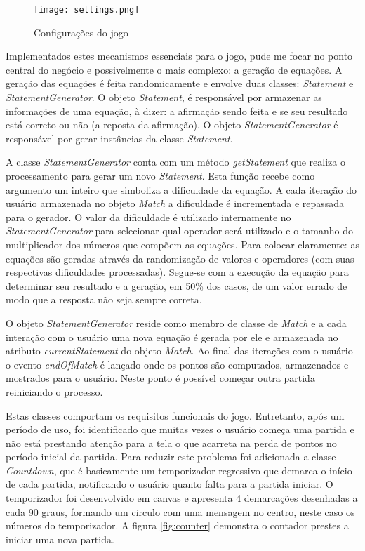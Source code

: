 \begin{figure}[H]
    \centering
    \texttt{[image: settings.png]}
	\caption{Configurações do jogo}
    \label{fig:configurations}
\end{figure}

Implementados estes mecanismos essenciais para o jogo, pude me focar no
ponto central do negócio e possivelmente o mais complexo: a geração
de equações. A geração das equações é feita randomicamente e
envolve duas classes: \textit{Statement} e \textit{StatementGenerator}.
O objeto \textit{Statement}, é responsável por armazenar as
informações de uma equação, à dizer: a afirmação sendo feita
e se seu resultado está correto ou não (a reposta da afirmação).
O objeto \textit{StatementGenerator} é responsável por gerar
instâncias da classe \textit{Statement}.

A classe \textit{StatementGenerator} conta com um método
\textit{getStatement} que realiza o processamento para gerar um novo
\textit{Statement}. Esta função recebe como argumento um inteiro que
simboliza a dificuldade da equação. A cada iteração do usuário
armazenada no objeto \textit{Match} a dificuldade é incrementada
e repassada para o gerador. O valor da dificuldade é utilizado
internamente no \textit{StatementGenerator} para selecionar qual
operador será utilizado e o tamanho do multiplicador dos números
que compõem as equações. Para colocar claramente: as equações
são geradas através da randomização de valores e operadores (com
suas respectivas dificuldades processadas). Segue-se com a execução da
equação para determinar seu resultado e a geração, em 50\% dos
casos, de um valor errado de modo que a resposta não seja sempre
correta.

O objeto \textit{StatementGenerator} reside como membro de classe de
\textit{Match} e a cada interação com o usuário uma nova equação
é gerada por ele e armazenada no atributo \textit{currentStatement}
do objeto \textit{Match}. Ao final das iterações com o usuário o
evento \textit{endOfMatch} é lançado onde os pontos são computados,
armazenados e mostrados para o usuário. Neste ponto é possível
começar outra partida reiniciando o processo.

Estas classes comportam os requisitos funcionais do jogo. Entretanto,
após um período de uso, foi identificado que muitas vezes o usuário
começa uma partida e não está prestando atenção para a tela o
que acarreta na perda de pontos no período inicial da partida. Para
reduzir este problema foi adicionada a classe \textit{Countdown},
que é basicamente um temporizador regressivo que demarca o início
de cada partida, notificando o usuário quanto falta para a partida
iniciar. O temporizador foi desenvolvido em canvas e apresenta 4
demarcações desenhadas a cada 90 graus, formando um circulo com uma
mensagem no centro, neste caso os números do temporizador. A figura
\ref{fig:counter} demonstra o contador prestes a iniciar uma nova
partida.

